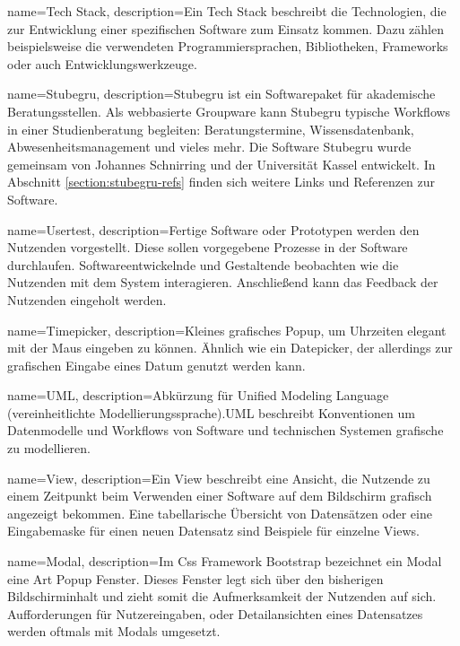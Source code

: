 \makeglossaries



{
    name=Tech Stack,
    description={Ein Tech Stack beschreibt die Technologien, die zur Entwicklung einer spezifischen Software zum Einsatz kommen. Dazu zählen beispielsweise die verwendeten Programmiersprachen, Bibliotheken, Frameworks oder auch Entwicklungswerkzeuge.}
}

{
    name=Stubegru,
    description={Stubegru ist ein Softwarepaket für akademische Beratungsstellen. Als webbasierte Groupware kann Stubegru typische Workflows in einer Studienberatung begleiten: Beratungstermine, Wissensdatenbank, Abwesenheitsmanagement und vieles mehr\cite{stubegruWebsite}. Die Software Stubegru wurde gemeinsam von Johannes Schnirring und der Universität Kassel entwickelt. In Abschnitt \ref{section:stubegru-refs} finden sich weitere Links und Referenzen zur Software.}
}

{
    name=Usertest,
    description={Fertige Software oder Prototypen werden den Nutzenden vorgestellt. Diese sollen vorgegebene Prozesse in der Software durchlaufen. Softwareentwickelnde und Gestaltende beobachten wie die Nutzenden mit dem System interagieren. Anschließend kann das Feedback der Nutzenden eingeholt werden.}
}

{
    name=Timepicker,
    description={Kleines grafisches Popup, um Uhrzeiten elegant mit der Maus eingeben zu können. Ähnlich wie ein Datepicker, der allerdings zur grafischen Eingabe eines Datum genutzt werden kann. \cite{datepicker}}
}

{
    name=UML,
    description={Abkürzung für Unified Modeling Language (vereinheitlichte Modellierungssprache).UML beschreibt Konventionen um Datenmodelle und Workflows von Software und technischen Systemen grafische zu modellieren.\cite{UML}}
}

{
    name=View,
    description={Ein View beschreibt eine Ansicht, die Nutzende zu einem Zeitpunkt beim Verwenden einer Software auf dem Bildschirm grafisch angezeigt bekommen. Eine tabellarische Übersicht von Datensätzen oder eine Eingabemaske für einen neuen Datensatz sind Beispiele für einzelne Views.}
}

{
    name=Modal,
    description={Im \gls{Css} Framework \gls{Bootstrap} bezeichnet ein Modal eine Art Popup Fenster. Dieses Fenster legt sich über den bisherigen Bildschirminhalt und zieht somit die Aufmerksamkeit der Nutzenden auf sich. Aufforderungen für Nutzereingaben, oder Detailansichten eines Datensatzes werden oftmals mit Modals umgesetzt.}
}


